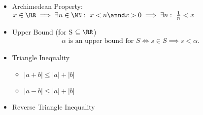 \begin{itemize}
\item
  Archimedean Property:
  \(x \in \RR \implies \exists n\in \NN:~ x < n \annd x > 0 \implies \exists n:~ \frac{1}{n} < x\)
\item
  Upper Bound (for S \(\subseteq \RR\))
  \begin{align*}  
  \alpha\text{ is an upper bound for } S \iff s \in S \implies s < \alpha
  .\end{align*}
\item
  Triangle Inequality

  \begin{itemize}
  \tightlist
  \item
    \({ | a + b | \leq | a | + | b | }\)
  \item
    \({ | a - b | \leq | a | + | b | }\)
  \end{itemize}
\item
  Reverse Triangle Inequality


\end{itemize}
